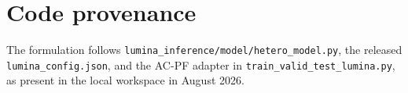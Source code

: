 \documentclass[10pt]{article}
\newcommand{\code}[1]{\texttt{#1}}
\begin{document}
\section*{Code provenance}
The formulation follows \code{lumina\_inference/model/hetero\_model.py}, the
released \code{lumina\_config.json}, and the AC-PF adapter in
\code{train\_valid\_test\_lumina.py}, as present in the local workspace in
August 2026.
\endgroup
\end{document}
